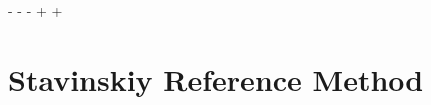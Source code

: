 \begin{figure}[h]
{\begin{table}[htbp]
\begin{comment}
-  
-  $\Xi^{0}$K$^{*0}$ & 0.014 & $\overline{\Xi}^{0}\overline{\mathrm{K}}^{*0}$ & 0.013 & $\Xi^{0}\overline{\mathrm{K}}^{*0}$ & 0.014 & $\overline{\Xi}^{0}$K$^{*0}$ & 0.013 & $\Xi^{0}$K$^{*0}$ & 0.007 & $\overline{\Xi}^{0}$K$^{*0}$ & 0.006 \\
-  
-  $\Xi^{-}$K$^{*0}$ & 0.018 & $\overline{\Xi}^{+}\overline{\mathrm{K}}^{*0}$ & 0.017 & $\Xi^{-}\overline{\mathrm{K}}^{*0}$ & 0.018 & $\overline{\Xi}^{+}$K$^{*0}$ & 0.017 & $\Xi^{-}$K$^{*0}$ & 0.009 & $\overline{\Xi}^{+}$K$^{*0}$ & 0.008 \\
-  
-  Other & 0.295 & Other & 0.310 & Other & 0.299 & Other & 0.307 & Other & 0.318 & Other & 0.330 \\
-  
-  Fakes & 0.048 & Fakes & 0.048 & Fakes & 0.048 & Fakes & 0.048 & Fakes & 0.048 & Fakes & 0.048 \\
-  
-  \hlineB{3.0}
- \end{tabular}}
- \caption{$\lambda$ values for the individual components of the \LamK correlation functions for the case of 3 and 10 residual contributions.}
- \label{tab:LambdaValues_All}
-\end{table}
-
-\end{landscape}
-\end{comment}
-%
-
-
+%
+%
 \section{Stavinskiy Reference Method}
 \label{App:StavMethod}
 

\end{table}}
\end{figure}
